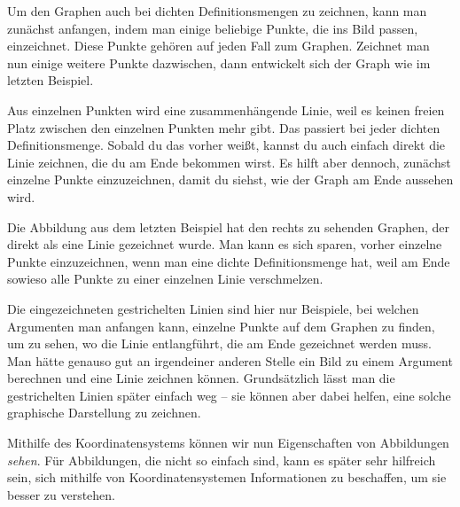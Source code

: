 \documentclass[../../main.tex]{subfiles}
\begin{document}
Um den Graphen auch bei dichten Definitionsmengen zu zeichnen, kann man zunächst anfangen, indem man einige beliebige Punkte, die ins Bild passen, einzeichnet. Diese Punkte gehören auf jeden Fall zum Graphen. Zeichnet man nun einige weitere Punkte dazwischen, dann entwickelt sich der Graph wie im letzten Beispiel.

Aus einzelnen Punkten wird eine zusammenhängende Linie, weil es keinen freien Platz zwischen den einzelnen Punkten mehr gibt. Das passiert bei jeder dichten Definitionsmenge. Sobald du das vorher weißt, kannst du auch einfach direkt die Linie zeichnen, die du am Ende bekommen wirst. Es hilft aber dennoch, zunächst einzelne Punkte einzuzeichnen, damit du siehst, wie der Graph am Ende aussehen wird.

\begin{example}{}
    
    Die Abbildung aus dem letzten Beispiel hat den rechts zu sehenden Graphen, der direkt als eine Linie gezeichnet wurde. Man kann es sich sparen, vorher einzelne Punkte einzuzeichnen, wenn man eine dichte Definitionsmenge hat, weil am Ende sowieso alle Punkte zu einer einzelnen Linie verschmelzen.
    
    Die eingezeichneten gestrichelten Linien sind hier nur Beispiele, bei welchen Argumenten man anfangen kann, einzelne Punkte auf dem Graphen zu finden, um zu sehen, wo die Linie entlangführt, die am Ende gezeichnet werden muss. Man hätte genauso gut an irgendeiner anderen Stelle ein Bild zu einem Argument berechnen und eine Linie zeichnen können. Grundsätzlich lässt man die gestrichelten Linien später einfach weg -- sie können aber dabei helfen, eine solche graphische Darstellung zu zeichnen.
\end{example}

Mithilfe des Koordinatensystems können wir nun Eigenschaften von Abbildungen \emph{sehen}. Für Abbildungen, die nicht so einfach sind, kann es später sehr hilfreich sein, sich mithilfe von Koordinatensystemen Informationen zu beschaffen, um sie besser zu verstehen.
\end{document}
